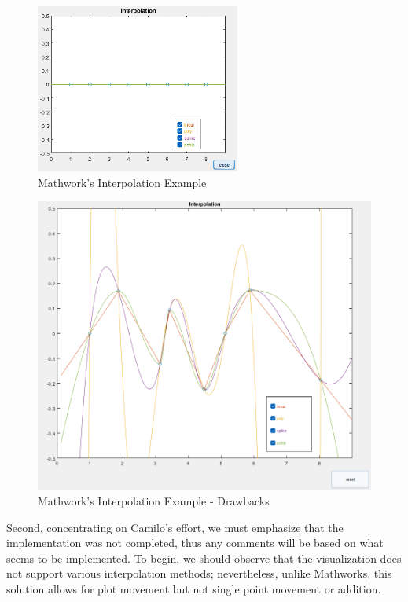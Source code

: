 \begin{figure}[H]
    \centering
    \includegraphics[width=0.6\textwidth]{Include/Images/Thesis/Development/Visualizers/INTERPOLATION VISUALIZER/Mathworks.Interpolation.Ex1.png}
    \caption{Mathwork's Interpolation Example}
    \label{fig:Mathworks Interpolation Example}
\end{figure}
\begin{figure}[H]
    \centering
    \includegraphics[width=\textwidth]{Include/Images/Thesis/Development/Visualizers/INTERPOLATION VISUALIZER/Mathworks.Interpolation.Ex1.1.png}
    \caption{Mathwork's Interpolation Example - Drawbacks}
    \label{fig:Mathwork's Interpolation Example - Drawbacks}
\end{figure}


Second, concentrating on Camilo's effort, we must emphasize that the implementation was not completed, thus any comments will be based on what seems to be implemented. To begin, we should observe that the visualization does not support various interpolation methods; nevertheless, unlike Mathworks, this solution allows for plot movement but not single point movement or addition. 

